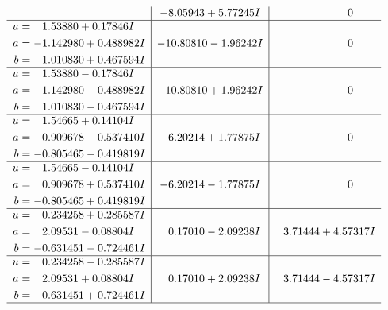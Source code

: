 \documentclass[1p]{elsarticle_modified}
\theoremstyle{definition}
\begin{document}
$$\begin{array}{c|c|c}
 & -8.05943 + 5.77245 I & \phantom{-0.000000 } 0 \\ \hline\begin{aligned}
u &= \phantom{-}1.53880 + 0.17846 I \\
a &= -1.142980 + 0.488982 I \\
b &= \phantom{-}1.010830 + 0.467594 I\end{aligned}
 & -10.80810 - 1.96242 I & \phantom{-0.000000 } 0 \\ \hline\begin{aligned}
u &= \phantom{-}1.53880 - 0.17846 I \\
a &= -1.142980 - 0.488982 I \\
b &= \phantom{-}1.010830 - 0.467594 I\end{aligned}
 & -10.80810 + 1.96242 I & \phantom{-0.000000 } 0 \\ \hline\begin{aligned}
u &= \phantom{-}1.54665 + 0.14104 I \\
a &= \phantom{-}0.909678 - 0.537410 I \\
b &= -0.805465 - 0.419819 I\end{aligned}
 & -6.20214 + 1.77875 I & \phantom{-0.000000 } 0 \\ \hline\begin{aligned}
u &= \phantom{-}1.54665 - 0.14104 I \\
a &= \phantom{-}0.909678 + 0.537410 I \\
b &= -0.805465 + 0.419819 I\end{aligned}
 & -6.20214 - 1.77875 I & \phantom{-0.000000 } 0 \\ \hline\begin{aligned}
u &= \phantom{-}0.234258 + 0.285587 I \\
a &= \phantom{-}2.09531 - 0.08804 I \\
b &= -0.631451 - 0.724461 I\end{aligned}
 & \phantom{-}0.17010 - 2.09238 I & \phantom{-}3.71444 + 4.57317 I \\ \hline\begin{aligned}
u &= \phantom{-}0.234258 - 0.285587 I \\
a &= \phantom{-}2.09531 + 0.08804 I \\
b &= -0.631451 + 0.724461 I\end{aligned}
 & \phantom{-}0.17010 + 2.09238 I & \phantom{-}3.71444 - 4.57317 I\\
 \hline 
 \end{array}$$\newpage$$\begin{array}{c|c|c}  

\end{array}$$
\end{document}
